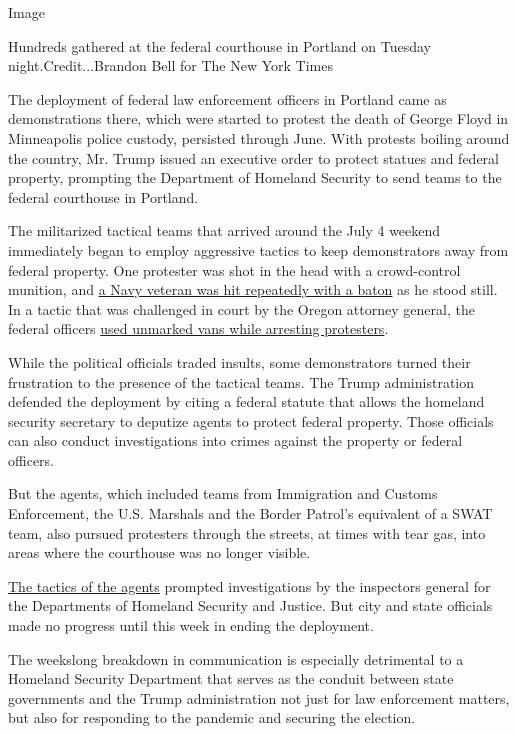 Image

Hundreds gathered at the federal courthouse in Portland on Tuesday
night.Credit...Brandon Bell for The New York Times

The deployment of federal law enforcement officers in Portland came as
demonstrations there, which were started to protest the death of George
Floyd in Minneapolis police custody, persisted through June. With
protests boiling around the country, Mr. Trump issued an executive order
to protect statues and federal property, prompting the Department of
Homeland Security to send teams to the federal courthouse in Portland.

The militarized tactical teams that arrived around the July 4 weekend
immediately began to employ aggressive tactics to keep demonstrators
away from federal property. One protester was shot in the head with a
crowd-control munition, and
\href{https://www.nytimes3xbfgragh.onion/2020/07/20/us/portland-protests-navy-christopher-david.html}{a
Navy veteran was hit repeatedly with a baton} as he stood still. In a
tactic that was challenged in court by the Oregon attorney general, the
federal officers
\href{https://www.nytimes3xbfgragh.onion/2020/07/17/us/portland-protests.html}{used
unmarked vans while arresting protesters}.

While the political officials traded insults, some demonstrators turned
their frustration to the presence of the tactical teams. The Trump
administration defended the deployment by citing a federal statute that
allows the homeland security secretary to deputize agents to protect
federal property. Those officials can also conduct investigations into
crimes against the property or federal officers.

But the agents, which included teams from Immigration and Customs
Enforcement, the U.S. Marshals and the Border Patrol's equivalent of a
SWAT team, also pursued protesters through the streets, at times with
tear gas, into areas where the courthouse was no longer visible.

\href{https://www.nytimes3xbfgragh.onion/2020/07/25/us/portland-federal-legal-jurisdiction-courts.html}{The
tactics of the agents} prompted investigations by the inspectors general
for the Departments of Homeland Security and Justice. But city and state
officials made no progress until this week in ending the deployment.

The weekslong breakdown in communication is especially detrimental to a
Homeland Security Department that serves as the conduit between state
governments and the Trump administration not just for law enforcement
matters, but also for responding to the pandemic and securing the
election.

